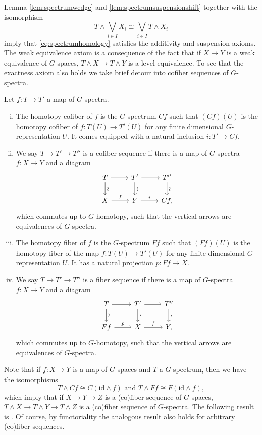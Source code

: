 Lemma \ref{lem:spectrumwedge} and \ref{lem:spectrumsuspensionshift} together with the isomorphism
\[
T\wedge \bigvee_{i\in I} X_i\cong \bigvee_{i\in I} T\wedge X_i
\] imply that \eqref{eq:spectrumhomology} satisfies the additivity and suspension axioms. The weak equivalence axiom
is a consequence of the fact that if $X\to Y$ is a weak equivalence of $G$-spaces,
$T\wedge X\to T\wedge Y$ is a level equivalence. To see that the exactness
axiom also holds we take brief detour into cofiber sequences of $G$-spectra.

\begin{mydef}\label{def:cofibersequencespectra}
Let $f:T\to T'$ a map of $G$-spectra.
\begin{enumerate}[(i)]
\item The homotopy cofiber of $f$ is the $G$-spectrum $Cf$ such that 
$(Cf)(U)$ is the homotopy cofiber of $f:T(U)\to T'(U)$ for
any finite dimensional $G$-representation $U$.
It comes equipped with a natural inclusion 
$i:T'\to Cf$.
\item We say $T\to T'\to T''$ is a cofiber sequence
if there is a map of $G$-spectra $f:X\to Y$
and a diagram
\[
\begin{tikzcd}
T\arrow{r}\arrow{d}[anchor = center, rotate = 90, yshift = -1ex]{\sim}
&T' \arrow{d}[anchor = center, rotate = 90, yshift = -1ex]{\sim}\arrow{r}
&T''\arrow{d}[anchor = center, rotate = 90, yshift = -1ex]{\sim}\\
X\arrow{r}{f}
&Y\arrow{r}{i}
&Cf,
\end{tikzcd}
\]
which commutes up to $G$-homotopy, such that the vertical
arrows are equivalences of $G$-spectra.
\item The homotopy fiber of $f$ is the $G$-spectrum
$Ff$ such that $(Ff)(U)$ is the homotopy fiber of the map
$f:T(U)\to T'(U)$ for any finite dimensional $G$-representation $U$.
It has a natural projection $p:Ff\to X$.
\item We say $T\to T'\to T''$ is a fiber sequence
if there is a map of $G$-spectra $f:X\to Y$
and a diagram
\[
\begin{tikzcd}
T\arrow{r}\arrow{d}[anchor = center, rotate = 90, yshift = -1ex]{\sim}
&T' \arrow{d}[anchor = center, rotate = 90, yshift = -1ex]{\sim}\arrow{r}
&T''\arrow{d}[anchor = center, rotate = 90, yshift = -1ex]{\sim}\\
Ff\arrow{r}{p}
&X\arrow{r}{f}
&Y,
\end{tikzcd}
\]
which commutes up to $G$-homotopy, such that the vertical
arrows are equivalences of $G$-spectra.
\end{enumerate}
\end{mydef}
Note that if $f:X\to Y$ is a map of $G$-spaces and $T$ a $G$-spectrum,
then we have the isomorphisms 
\[
T\wedge Cf\cong C(\mathrm{id}\wedge f) \text{ and } T\wedge Ff\cong F(\mathrm{id}\wedge f),
\]
which imply that if $X\to Y\to Z$ is a (co)fiber sequence of $G$-spaces,
$T\wedge X\to T\wedge Y\to T\wedge Z$ is a (co)fiber sequence of $G$-spectra.
The following result is \cite[Theorem~III.3.5, \pno~45]{mandellmay}.
Of course, by functoriality the analogous result also holds for arbitrary (co)fiber
sequences.

